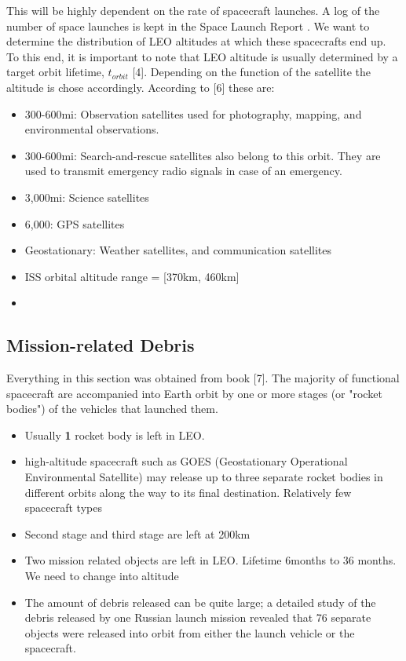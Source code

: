 \documentclass{article}
\theoremstyle{definition}
\begin{document}
\begin{enumerat}
This will be highly dependent on the rate of spacecraft launches. A log of the number of space launches is kept in the Space Launch Report \cite{spaceLaunchReport}. We want to determine the distribution of LEO altitudes at which these spacecrafts end up. To this end, it is important to note that LEO altitude is usually determined by a target orbit lifetime, $t_{orbit}$ [4]. Depending on the function of the satellite the altitude is chose accordingly. According to [6] these are:

\begin{itemize}
  \item 300-600mi: Observation satellites used for photography, mapping, and environmental observations.
  \item 300-600mi: Search-and-rescue satellites also belong to this orbit. They are used to transmit emergency radio signals in case of an emergency.
  \item 3,000mi: Science satellites
  \item 6,000: GPS satellites
  \item Geostationary: Weather satellites, and communication satellites
  \item ISS orbital altitude range = [370km, 460km] \cite{esaISS}
  \item
\end{itemize}




\subsection*{Mission-related Debris}
Everything in this section was obtained from book [7].
The majority of functional spacecraft are accompanied into Earth orbit by one or more stages (or "rocket bodies") of the vehicles that launched them. 

\begin{itemize}
  \item Usually \textbf{1} rocket body is left in LEO.
  \item high-altitude spacecraft such as GOES (Geostationary Operational Environmental Satellite) may release up to three separate rocket bodies in different orbits along the way to its final destination. Relatively few spacecraft types 
  \item Second stage and third stage are left at 200km
  \item Two mission related objects are left in LEO. Lifetime 6months to 36 months. We need to change into altitude
  \item The amount of debris released can be quite large; a detailed study of the debris released by one Russian launch mission revealed that 76 separate objects were released into orbit from either the launch vehicle or the spacecraft.
  

\end{itemize}
\end{enumerat}
\end{document}
